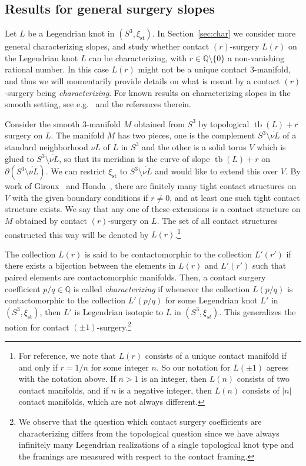 \documentclass[11pt]{amsart} %
\DeclareMathOperator{\tb}{tb}
\newcommand{\Q}{\mathbb{Q}}
\newcommand{\xist}{\xi_{\mathrm{st}}}
\theoremstyle{plain}
\theoremstyle{definition}
\begin{document}
\subsection{Results for general surgery slopes}\label{ssec:generalslope}
Let $L$ be a Legendrian knot in $(S^3,\xist)$. In Section~\ref{sec:char} we consider more general characterizing slopes, and study whether contact $(r)$-surgery $L(r)$ on the Legendrian knot $L$ can be characterizing, with $r\in\Q\setminus\{0\}$ a non-vanishing rational number. In this case $L(r)$ might not be a unique contact 3-manifold, and thus we will momentarily provide details on what is meant by a contact $(r)$-surgery being {\it characterizing}. For known results on characterizing slopes in the smooth setting, see e.g.~\cite{BakerMotegi18, KronheimerMrowkaOzsvathSzabo07, Lackenby19, McCoy19, McCoy20, NiZhang14, OzsvathSzabo19} and the references therein. 

Consider the smooth 3-manifold $M$ obtained from $S^3$ by topological $\tb(L)+r$ surgery on $L$. The manifold $M$ has two pieces, one is the complement $S^3\setminus\mathring{\nu L}$ of a standard neighborhood $\nu L$ of $L$ in $S^3$ and the other is a solid torus $V$ which is glued to $S^3\setminus\mathring{\nu L}$, so that its meridian is the curve of slope $\tb(L)+r$ on $\partial (S^3\setminus \mathring{\nu L})$. We can restrict $\xist$ to $S^3\setminus \mathring{\nu L}$ and would like to extend this over $V$. By work of Giroux~\cite{Giroux00} and Honda~\cite{Honda00a}, there are finitely many tight contact structures on $V$ with the given boundary conditions if $r\not=0$, and at least one such tight contact structure exists. We say that any one of these extensions is a contact structure on $M$ obtained by contact $(r)$-surgery on $L$. The set of all contact structures constructed this way will be denoted by $L(r)$.\footnote{For reference, we note that $L(r)$ consists of a unique contact manifold if and only if $r=1/n$ for some integer $n$. So our notation for $L(\pm 1)$ agrees with the notation above. If $n>1$ is an integer, then $L(n)$ consists of two contact manifolds, and if $n$ is a negative integer, then $L(n)$ consists of $|n|$ contact manifolds, which are not always different.}

The collection $L(r)$ is said to be contactomorphic to the collection $L'(r')$ if there exists a bijection between the elements in $L(r)$ and $L'(r')$ such that paired elements are contactomorphic manifolds. Then, a contact surgery coefficient $p/q\in\Q$ is called {\it characterizing} if whenever the collection $L(p/q)$ is contactomorphic to the collection $L'(p/q)$ for some Legendrian knot $L'$ in $(S^3,\xist)$, then $L'$ is Legendrian isotopic to $L$ in $(S^3,\xi_{st})$. This generalizes the notion for contact $(\pm1)$-surgery.\footnote{We observe that the question which contact surgery coefficients are characterizing differs from the topological question since we have always infinitely many Legendrian realizations of a single topological knot type and the framings are measured with respect to the contact framing.}
\end{document}
